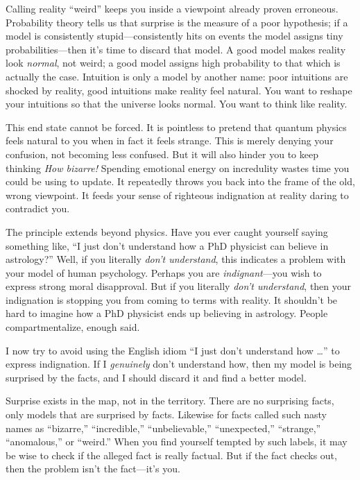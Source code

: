 {
 Calling reality ``weird'' keeps
you inside a viewpoint already proven erroneous. Probability theory
tells us that surprise is the measure of a poor hypothesis; if a model
is consistently stupid---consistently hits on events the model assigns
tiny probabilities---then it's time to discard that
model. A good model makes reality look \textit{normal}, not weird; a
good model assigns high probability to that which is actually the case.
Intuition is only a model by another name: poor intuitions are shocked
by reality, good intuitions make reality feel natural. You want to
reshape your intuitions so that the universe looks normal. You want to
think like reality.}

{
 This end state cannot be forced. It is pointless to pretend that
quantum physics feels natural to you when in fact it feels strange.
This is merely denying your confusion, not becoming less confused. But
it will also hinder you to keep thinking \textit{How bizarre!} Spending
emotional energy on incredulity wastes time you could be using to
update. It repeatedly throws you back into the frame of the old, wrong
viewpoint. It feeds your sense of righteous indignation at reality
daring to contradict you.}

{
 The principle extends beyond physics. Have you ever caught
yourself saying something like, ``I just
don't understand how a PhD physicist can believe in
astrology?'' Well, if you literally
\textit{don't understand}, this indicates a problem
with your model of human psychology. Perhaps you are
\textit{indignant}{}---you wish to express strong moral disapproval.
But if you literally \textit{don't understand}, then
your indignation is stopping you from coming to terms with reality. It
shouldn't be hard to imagine how a PhD physicist ends
up believing in astrology. People compartmentalize, enough said.}

{
 I now try to avoid using the English idiom ``I
just don't understand how \ldots'' to
express indignation. If I \textit{genuinely} don't
understand how, then my model is being surprised by the facts, and I
should discard it and find a better model.}

{
 Surprise exists in the map, not in the territory. There are no
surprising facts, only models that are surprised by facts. Likewise for
facts called such nasty names as
``bizarre,''
``incredible,''
``unbelievable,''
``unexpected,''
``strange,''
``anomalous,'' or
``weird.'' When you find yourself
tempted by such labels, it may be wise to check if the alleged fact is
really factual. But if the fact checks out, then the problem
isn't the fact---it's you.}

